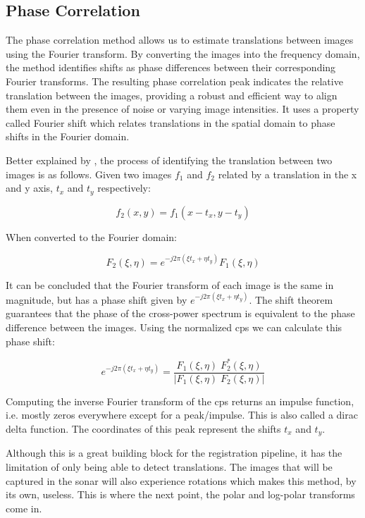 \subsection{Phase Correlation}

The phase correlation method allows us to estimate translations between images using the Fourier transform. By converting the images into the frequency domain, the method identifies shifts as phase differences between their corresponding Fourier transforms. The resulting phase correlation peak indicates the relative translation between the images, providing a robust and efficient way to align them even in the presence of noise or varying image intensities. It uses a property called Fourier shift which relates translations in the spatial domain to phase shifts in the Fourier domain. 


Better explained by \citeauthor{Reddy1996}\cite{Reddy1996}, the process of identifying the translation between two images is as follows. Given two images \(f_1\) and \(f_2\) related by a translation in the x and y axis, \(t_x\) and \(t_y\) respectively:

\[f_2(x,y)=f_1(x-t_x,y-t_y)\]

When converted to the Fourier domain:

\[F_2(\xi,\eta)=e^{-j2\pi(\xi t_x + \eta t_y)} F_1(\xi,\eta)\]

It can be concluded that the Fourier transform of each image is the same in magnitude, but has a phase shift given by \(e^{-j2\pi(\xi t_x + \eta t_y)}\). The shift theorem guarantees that the phase of the cross-power spectrum is equivalent to the phase difference between the images. Using the normalized \acrfull{cps} we can calculate this phase shift:

\[e^{-j2\pi(\xi t_x + \eta t_y)} = \frac{F_1(\xi,\eta) \; F_2^*(\xi,\eta)}{|F_1(\xi,\eta) \; F_2(\xi,\eta)|}\]

Computing the inverse Fourier transform of the \acrshort{cps} returns an impulse function, i.e. mostly zeros everywhere except for a peak/impulse. This is also called a dirac delta function. The coordinates of this peak represent the shifts \(t_x\) and \(t_y\).

Although this is a great building block for the registration pipeline, it has the limitation of only being able to detect translations. The images that will be captured in the sonar will also experience rotations which makes this method, by its own, useless. This is where the next point, the polar and log-polar transforms come in.

